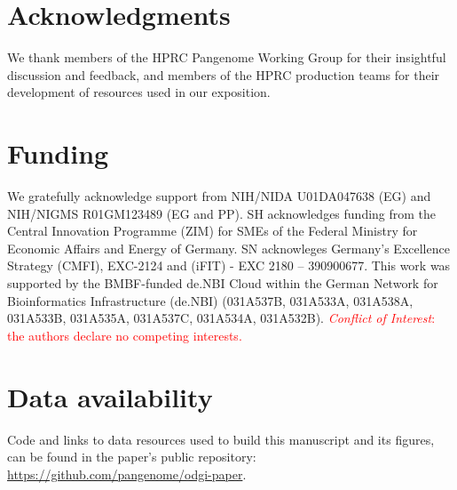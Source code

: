 \documentclass{bioinfo}
\newcommand{\REVIEWED}[1]{{\textcolor{Red}{#1}}}
\begin{document}

\section*{Acknowledgments}

We thank members of the HPRC Pangenome Working Group for their insightful discussion and feedback, and members of the HPRC production teams for their development of resources used in our exposition.

\section*{Funding}

We gratefully acknowledge support from NIH/NIDA U01DA047638 (EG) and NIH/NIGMS R01GM123489 (EG and PP).
SH acknowledges funding from the Central Innovation Programme (ZIM) for SMEs of the Federal Ministry for Economic Affairs and Energy of Germany. SN acknowleges Germany’s Excellence Strategy (CMFI), EXC-2124 and (iFIT) - EXC 2180 – 390900677.
This work was supported by the BMBF-funded de.NBI Cloud within the German Network for Bioinformatics Infrastructure (de.NBI) (031A537B, 031A533A, 031A538A, 031A533B, 031A535A, 031A537C, 031A534A, 031A532B).
\linebreak
\linebreak
\REVIEWED{\textit{Conflict of Interest}: the authors declare no competing interests.}


\section*{Data availability}

Code and links to data resources used to build this manuscript and its figures, can be found in the paper's public repository: \url{https://github.com/pangenome/odgi-paper}.



%
%
%
%
%
%
%

\end{document}
